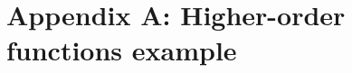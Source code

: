 \documentclass{uva-inf-article}
\begin{document}
\newpage

\printbibliography

\newpage

\newpage
\section{Appendix A: Higher-order functions example}

\end{document}
